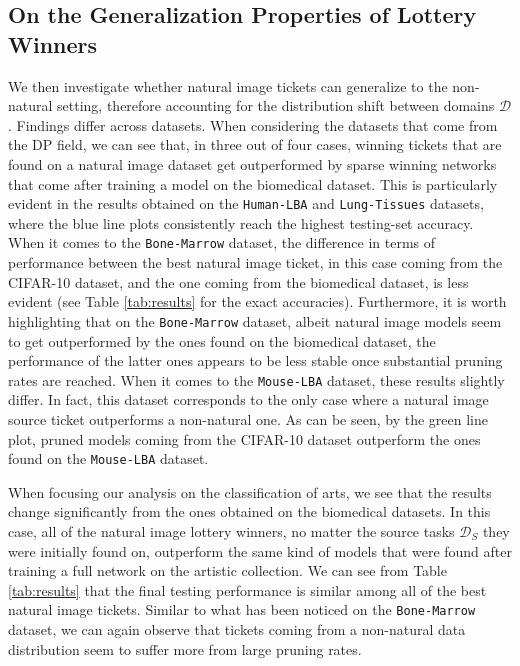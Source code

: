 




\subsection{On the Generalization Properties of Lottery Winners}
We then investigate whether natural image tickets can generalize to the non-natural setting, therefore accounting for the distribution shift between domains $\mathcal{D}$. Findings differ across datasets. When considering the datasets that come from the DP field, we can see that, in three out of four cases, winning tickets that are found on a natural image dataset get outperformed by sparse winning networks that come after training a model on the biomedical dataset. This is particularly evident in the results obtained on the \texttt{Human-LBA} and \texttt{Lung-Tissues} datasets, where the blue line plots consistently reach the highest testing-set accuracy. When it comes to the \texttt{Bone-Marrow} dataset, the difference in terms of performance between the best natural image ticket, in this case coming from the CIFAR-10 dataset, and the one coming from the biomedical dataset, is less evident (see Table \ref{tab:results} for the exact accuracies). Furthermore, it is worth highlighting that on the \texttt{Bone-Marrow} dataset, albeit natural image models seem to get outperformed by the ones found on the biomedical dataset, the performance of the latter ones appears to be less stable once substantial pruning rates are reached. When it comes to the \texttt{Mouse-LBA} dataset, these results slightly differ. In fact, this dataset corresponds to the only case where a natural image source ticket outperforms a non-natural one. As can be seen, by the green line plot, pruned models coming from the CIFAR-10 dataset outperform the ones found on the \texttt{Mouse-LBA} dataset. 

When focusing our analysis on the classification of arts, we see that the results change significantly from the ones obtained on the biomedical datasets. In this case, all of the natural image lottery winners, no matter the source tasks $\mathcal{D}_S$ they were initially found on, outperform the same kind of models that were found after training a full network on the artistic collection. We can see from Table \ref{tab:results} that the final testing performance is similar among all of the best natural image tickets. Similar to what has been noticed on the \texttt{Bone-Marrow} dataset, we can again observe that tickets coming from a non-natural data distribution seem to suffer more from large pruning rates. 

